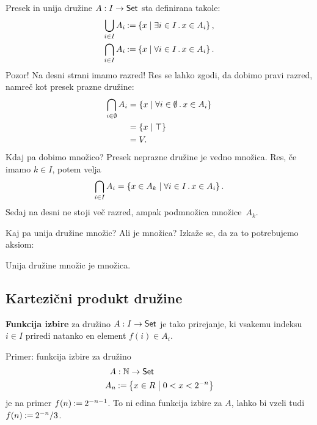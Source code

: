 Presek in unija družine $A : I \to \mathsf{Set}$ sta definirana takole:
%
\begin{align*}
  \bigcup_{i \in I} A_i &\mathbin{{:}{=}} \left\{ x \; \middle| \; \exists i \in I \,.\, x \in A_i \right\},
  \\
  \bigcap_{i \in I} A_i &\mathbin{{:}{=}} \left\{ x \; \middle| \; \forall  i \in I \,.\, x \in A_i \right\}.
\end{align*}
%
Pozor! Na desni strani imamo razred! Res se lahko zgodi, da dobimo pravi razred, namreč
kot presek prazne družine:
%
\begin{align*}
  \bigcap_{i \in \emptyset} A_i
  &= \left\{ x \; \middle| \; \forall  i \in \emptyset \,.\, x \in A_i \right\} \\
  &= \left\{ x \; \middle| \; \top \right\} \\
  &= V.
\end{align*}
%
Kdaj pa dobimo množico? Presek neprazne družine je vedno množica. Res, če imamo
$k \in I$, potem velja
%
\begin{equation*}
    \bigcap_{i \in I} A_i = \left\{ x \in A_k \; \middle| \; \forall i \in I \,.\, x \in A_i\right\}.
\end{equation*}
%
Sedaj na desni ne stoji več razred, ampak podmnožica množice~$A_k$.

Kaj pa unija družine množic? Ali je množica? Izkaže se, da za to potrebujemo aksiom:

\begin{aksiom}
  Unija družine množic je množica.
\end{aksiom}


\subsection{Kartezični produkt družine}

\begin{definicija}
  \textbf{Funkcija izbire} za družino $A : I \to \mathsf{Set}$ je tako prirejanje, ki vsakemu indeksu $i \in I$ priredi natanko en element $f(i) \in A_i$.
 \end{definicija}

 \begin{primer}
   Primer: funkcija izbire za družino
   \begin{align*}
   A &: \mathbb{N} \to \mathsf{Set} \\
   A_n &\mathbin{{:}{=}} \left\{ x \in R \; \middle| \; 0 < x < 2^{-n} \right\}
   \end{align*}
   je na primer $f(n) \mathbin{{:}{=}} 2^{-n - 1}$. To ni edina funkcija izbire za $A$, lahko bi vzeli tudi $f(n) \mathbin{{:}{=}} 2^{-n} / 3$.
 \end{primer}

